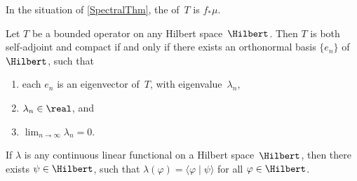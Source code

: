 \begin{defn} \label{SpectralMeasDefn}
In the situation of \cref{SpectralThm}, the  of~$T$ is $f_*\mu$.
\end{defn}

\begin{cor} \label{SpectralThmCpct}
Let $T$ be a bounded operator on any Hilbert space~$\Hilbert$. Then $T$ is both self-adjoint and compact if and only if there exists an orthonormal basis $\{e_n\}$ of~$\Hilbert$, such that
\noprelistbreak
	\begin{enumerate}
	\item each $e_n$ is an eigenvector of~$T$, with eigenvalue~$\lambda_n$,
	\item $\lambda_n \in \real$,
	and
	\item $\lim_{n \to \infty} \lambda_n = 0$.
	\end{enumerate}
\end{cor}

\begin{prop}
If $\lambda$ is any continuous linear functional on a Hilbert space~$\Hilbert$, then there exists $\psi \in \Hilbert$, such that $\lambda(\varphi) = \langle \varphi \mid \psi \rangle$ for all $\varphi \in \Hilbert$.
\end{prop}



%







